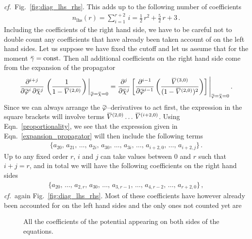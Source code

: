 \documentclass[11pt]{book}
\newcommand{\overbar}[1]{\mkern 1.5mu\overline{\mkern-1.5mu#1\mkern-1.5mu}\mkern 1.5mu}
\newcommand{\bV}{\overbar V}
\newcommand{\bp}{\overbar \varphi}
\newcommand{\bg}{\overbar \gamma}
\newcommand{\bc}{\overbar \chi}
\newcommand\cf{\textit{cf.}\ }
\numberwithin{equation}{chapter}
\begin{document}
\cf Fig.~\ref{fig:diag_lhs_rhs}. This adds up to the following number of coefficients
\begin{align}
  n_{\text{lhs}}(r) = \sum_{i=1}^{r+2} \, i = \frac{1}{2} \, r^2 + \frac{5}{2} \, r + 3 \,.
\end{align}
Including the coefficients of the right hand side,
we have to be careful not to double count any coefficients that have already been taken account of on the
left hand sides. Let us suppose we have fixed the cutoff and let us assume that for the
moment $\bg=\mathrm{const.}$
Then all additional coefficients on the right hand side come from the expansion of the propagator
\begin{align}
  \label{expansion_propagator}
  \frac{\partial^{i+j}}{\partial \bp^i \, \partial \bc^j} \, \left( \frac{1}{1 - \bV^{(2,0)}} \right) \bigg|_{\bp = \bc = 0} =
  \frac{\partial^{j}}{\partial \bc^j} \left[ \frac{\partial^{i-1}}{\partial \bp^{i-1}} \left( \frac{\bV^{(3,0)}}{(1 - \bV^{(2,0)})^2} \right) \right] \Bigg|_{\bp = \bc = 0}\, .
\end{align}
Since we can always arrange the $\bp$--derivatives to act first,
the expression in the square brackets will involve terms $\bV^{(2,0)} \dots \, \bV^{(i+2,0)}$.
Using Eqn.~\eqref{proportionality}, we see that the expression given in Eqn.~\eqref{expansion_propagator}
will then include the following terms
\begin{align}
  \bigg\lbrace
  a_{\scriptscriptstyle 20},\, a_{\scriptscriptstyle 21},\, \dots ,\,
  a_{\scriptscriptstyle 2i},\, a_{\scriptscriptstyle 30},\, \dots ,\,
  a_{\scriptscriptstyle 3i},\, \dots,\,
  a_{\scriptscriptstyle i+2,0}, \, \dots,\, a_{\scriptscriptstyle i+2,j}
  \bigg\rbrace \,.
\end{align}
Up to any fixed order $r$, $i$ and $j$ can take values between $0$ and $r$ such that $i+j = r$,
and in total we will have the following coefficients on the right hand sides
\begin{align}
  \bigg\lbrace
  a_{\scriptscriptstyle 20},\, \dots ,\,
  a_{\scriptscriptstyle 2,r},\, a_{\scriptscriptstyle 30},\, \dots ,\,
  a_{\scriptscriptstyle 3,r-1},\, \dots ,\,
  a_{\scriptscriptstyle 4,r-2},\, \dots, \, a_{\scriptscriptstyle r+2,0}
  \bigg\rbrace \,,
\end{align}
\cf again Fig.~\ref{fig:diag_lhs_rhs}.
Most of these coefficients have however already been accounted for on the left hand sides and
the only ones not counted yet are
\begin{figure}
  \begin{center}
    
  \end{center}
  \caption{
    All the coefficients of the potential appearing on both sides of the equations.
  }
  \label{fig:diag-all}
\end{figure}
\end{document}
